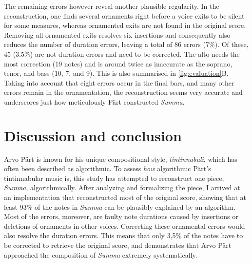 \documentclass{interact}
\begin{document}
The remaining errors however reveal another plausible regularity.
In the reconstruction, one finds several  ornaments right before a voice exits to be silent for some measures, whereas ornamented exits are not found in the original score.
Removing all ornamented exits resolves six insertions and consequently also reduces the number of duration errors, leaving a total of 86 errors (7\%).
Of these, 45 (3.5\%) are not duration errors and need to be corrected.
The alto needs the most correction (19 notes) and is around twice as inaccurate as the soprano, tenor, and bass (10, 7, and 9).
This is also summarised in \autoref{fig:evaluation}B.
Taking into account that eight errors occur in the final bars, and many other errors remain in the ornamentation, the reconstruction seems very accurate and underscores just how meticulously Pärt constructed \emph{Summa}.




\section{Discussion and conclusion}

Arvo Pärt is known for his unique compositional style, \emph{tintinnabuli}, which has often been described as algorithmic.
To assess \emph{how} algorithmic Pärt's tintinnabular music is, this study has attempted to reconstruct one piece, \emph{Summa}, algorithmically.
After analyzing and formalizing the piece, I arrived at an implementation that reconstructed most of the original score, showing that at least 93\% of the notes in \emph{Summa} can be plausibly explained by an algorithm.
Most of the errors, moreover, are faulty note durations caused by insertions or deletions of ornaments in other voices.
Correcting these ornamental errors would also resolve the duration errors. 
This means that only 3,5\% of the notes have to be corrected to retrieve the original score, and demonstrates that Arvo Pärt approached the composition of \emph{Summa} extremely systematically.
\end{document}
